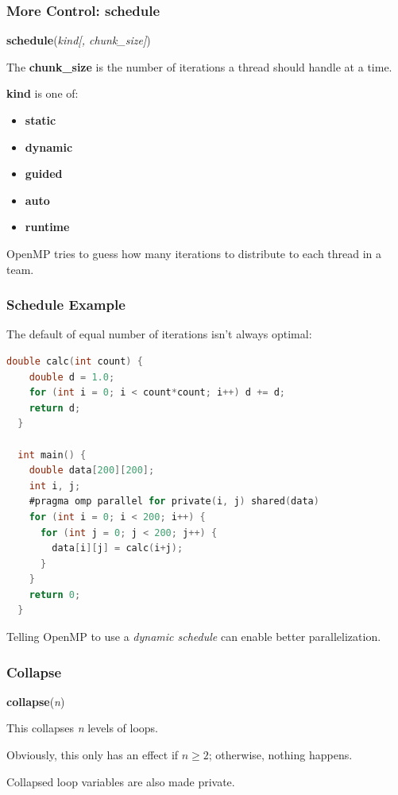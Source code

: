 \begin{frame}
\frametitle{More Control: schedule}

  \begin{center}
    {\bf schedule}({\it kind[, chunk\_size]})
  \end{center}

    The {\bf chunk\_size} is the number of iterations a thread
      should handle at a time. 
      
{\bf kind} is one of:
      \begin{itemize}
        \item {\bf static}
		\item {\bf dynamic}
        \item {\bf guided}
        \item {\bf auto}
        \item {\bf runtime}
      \end{itemize}

OpenMP tries to guess how many iterations to distribute to each thread
in a team.

\end{frame}

\begin{frame}[fragile]
\frametitle{Schedule Example}

The default of equal number of iterations isn't always optimal:

\begin{lstlisting}[language=C,morekeywords={foreach,pragma,omp,parallel,single,nowait,task,untied,barrier,taskyield}]
  double calc(int count) {
    double d = 1.0;
    for (int i = 0; i < count*count; i++) d += d;
    return d;
  }

  int main() {
    double data[200][200];
    int i, j;
    #pragma omp parallel for private(i, j) shared(data)
    for (int i = 0; i < 200; i++) {
      for (int j = 0; j < 200; j++) {
        data[i][j] = calc(i+j);
      }
    }
    return 0;
  }
\end{lstlisting}

Telling OpenMP to use a \emph{dynamic schedule} can enable better
parallelization.

\end{frame}


\begin{frame}
\frametitle{Collapse}

  \begin{center}
    {\bf collapse}({\it n})
  \end{center}

    This collapses {\it n} levels of loops. 
    
    Obviously, this only has
    an effect if $n \ge 2$; otherwise, nothing happens. 
    
    Collapsed loop
    variables are also made private.


\end{frame}


